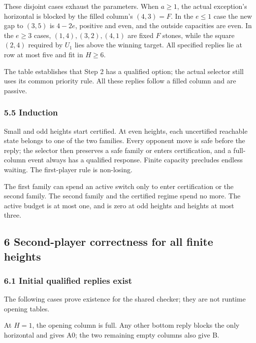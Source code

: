 \documentclass[
  a4paper,
]{article}
\begin{document}
These disjoint cases exhaust the parameters. When \(a\ge1\), the actual
exception's horizontal is blocked by the filled column's \((4,3)=F\). In
the \(e\le1\) case the new gap to \((3,5)\) is \(4-2e\), positive and
even, and the outside capacities are even. In the \(e\ge3\) cases,
\((1,4),(3,2),(4,1)\) are fixed \(F\) stones, while the square \((2,4)\)
required by \(U_1\) lies above the winning target. All specified replies
lie at row at most five and fit in \(H\ge6\).

The table establishes that Step 2 has a qualified option; the actual
selector still uses its common priority rule. All these replies follow a
filled column and are passive.

\subsubsection{5.5 Induction}\label{induction}

Small and odd heights start certified. At even heights, each uncertified
reachable state belongs to one of the two families. Every opponent move
is safe before the reply; the selector then preserves a safe family or
enters certification, and a full-column event always has a qualified
response. Finite capacity precludes endless waiting. The first-player
rule is non-losing.

The first family can spend an active switch only to enter certification
or the second family. The second family and the certified regime spend
no more. The active budget is at most one, and is zero at odd heights
and heights at most three.

\subsection{6 Second-player correctness for all finite
heights}\label{second-player-correctness-for-all-finite-heights}

\subsubsection{6.1 Initial qualified replies
exist}\label{initial-qualified-replies-exist}

The following cases prove existence for the shared checker; they are not
runtime opening tables.

At \(H=1\), the opening column is full. Any other bottom reply blocks
the only horizontal and gives A0; the two remaining empty columns also
give B.
\end{document}
